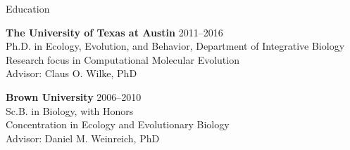 \documentclass{resume} %
\begin{document}

\vspace*{0.35cm}
\begin{rSection}{Education}
\vspace*{0.25cm}

{\bf The University of Texas at Austin} \hfill {2011--2016} \\
Ph.D. in Ecology, Evolution, and Behavior, Department of Integrative Biology \\
Research focus in Computational Molecular Evolution \\
Advisor: Claus O. Wilke, PhD \\

\smallskip

{\bf Brown University} \hfill {2006--2010} \\
Sc.B. in Biology, with Honors \\
Concentration in Ecology and Evolutionary Biology \\
Advisor: Daniel M. Weinreich, PhD \\

\end{rSection}
\end{document}

